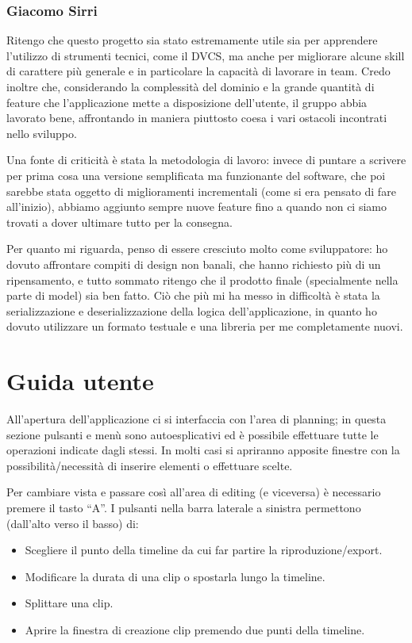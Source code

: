 \documentclass[a4paper,12pt]{report}
\begin{document}
\subsection{Giacomo Sirri}
Ritengo che questo progetto sia stato estremamente utile sia per apprendere l’utilizzo di strumenti tecnici, come il DVCS, ma anche per migliorare alcune skill di carattere più generale e in particolare la capacità di lavorare in team. Credo inoltre che, considerando la complessità del dominio e la grande quantità di feature che l’applicazione mette a disposizione dell’utente, il gruppo abbia lavorato bene, affrontando in maniera piuttosto coesa i vari ostacoli incontrati nello sviluppo. 

Una fonte di criticità è stata la metodologia di lavoro: invece di puntare a scrivere per prima cosa una versione semplificata ma funzionante del software, che poi sarebbe stata oggetto di miglioramenti incrementali (come si era pensato di fare all’inizio), abbiamo aggiunto sempre nuove feature fino a quando non ci siamo trovati a dover ultimare tutto per la consegna.

Per quanto mi riguarda, penso di essere cresciuto molto come sviluppatore: ho dovuto affrontare compiti di design non banali, che hanno richiesto più di un ripensamento, e tutto sommato ritengo che il prodotto finale (specialmente nella parte di model) sia ben fatto. Ciò che più mi ha messo in difficoltà è stata la serializzazione e deserializzazione della logica dell’applicazione, in quanto ho dovuto utilizzare un formato testuale e una libreria per me completamente nuovi. 

\endsubsection
\endsection

\appendix
\chapter{Guida utente}
All’apertura dell’applicazione ci si interfaccia con l'area di planning; in questa sezione pulsanti e menù sono autoesplicativi ed è possibile effettuare tutte le operazioni indicate dagli stessi. In molti casi si apriranno apposite finestre con la possibilità/necessità di inserire elementi o effettuare scelte. 

Per cambiare vista e passare così all’area di editing (e viceversa) è necessario premere il tasto “A”. I pulsanti nella barra laterale a sinistra permettono (dall'alto verso il basso) di:
\begin{itemize}
    \item Scegliere il punto della timeline da cui far partire la riproduzione/export.
    \item Modificare la durata di una clip o spostarla lungo la timeline.
    \item Splittare una clip.
    \item Aprire la finestra di creazione clip premendo due punti della timeline.
\end{itemize}
\end{document}
